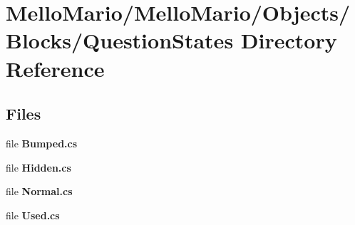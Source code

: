 \section{Mello\+Mario/\+Mello\+Mario/\+Objects/\+Blocks/\+Question\+States Directory Reference}
\label{dir_ebd7e7ba25d77005ad57d2224b839b8a}
\subsection*{Files}
\begin{DoxyCompactItemize}
\item 
file \textbf{ Bumped.\+cs}
\item 
file \textbf{ Hidden.\+cs}
\item 
file \textbf{ Normal.\+cs}
\item 
file \textbf{ Used.\+cs}
\end{DoxyCompactItemize}
